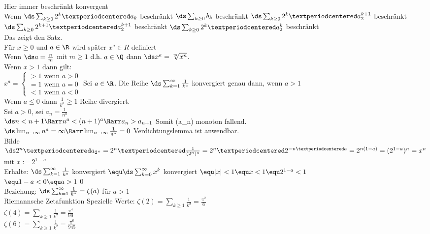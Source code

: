 Hier immer beschränkt \equ konvergent\\
Wenn $\ds \sum_{k \geq 0} 2^k · a_k$ beschränkt \Rarr $\ds \sum_{k \geq 0} b_k$ beschränkt \Rarr $\ds \sum_{k \geq 0} 2^{k} · a_2^{k+1}$ beschränkt \equ $\ds \sum_{k \geq 0} 2^{k+1} · a_2^{k+1}$ beschränkt \equ $\ds \sum_{k \geq 0} 2^{k} · a_2^{k}$ beschränkt\\
Das zeigt den Satz.\\
    Für $ x\geq 0$ und $a \in \R$ wird später $x^a \in R$ definiert\\
    Wenn $\ds a = \frac{n}{m}$ mit $m \geq 1$ d.h. $a \in \Q$ dann $\ds x^a = \sqrt[m]{x^n}$.\\
    Wenn $x > 1$ dann gilt: \\
    $x^a = \begin{cases} >1 \mbox{ wenn }a>0\\ =1 \mbox{ wenn }a=0\\ <1\mbox{ wenn }a<0 \end{cases}$
%
Sei $a \in \R$. Die Reihe $\ds \sum_{k=1}^{\infty} \frac{1}{k^a}$ konvergiert genau dann, wenn $a > 1$\\
\bew
Wenn $a \leq 0$ dann $\frac{1}{k^a} \geq 1$ \Rarr Reihe divergiert.\\
Sei $a >0$, sei $a_n = \frac{1}{n^a}$ \\
$\ds n < n+1 \Rarr n^a < (n+1)^a \Rarr a_n > a_{n+1}$ Somit (a_n) monoton fallend.\\
$\ds \lim_{n\to \infty} n^a = \infty \Rarr \lim_{n \to \infty} \frac{1}{n^a} = 0$ \Rarr Verdichtungslemma ist anwendbar.\\
Bilde $\ds 2^n · a_{2^n} = 2^n · \frac{1}{(2^n)^a} = 2^n · 2^{-n · a} = 2^{n(1-a)} = (2^{1-a})^n = x^n$\\
mit $x:=2^{1-a}$\\
Erhalte:
$\ds \sum_{k=1}^\infty \frac{1}{k^a}$ konvergiert $\equ \ds \sum_{k=0}^\infty x^k$ konvergiert $\equ |x|<1 \equ x<1 \equ 2^{1-a} <1$\\
$\equ 1-a<0 \equ a>1$\qed\\[4pt]
Beziehung:
$\ds \sum_{k=1}^\infty\frac{1}{k^a}=\zeta (a)$ für $a>1$\\
Riemannsche Zetafunktion
Spezielle Werte:
$\zeta (2) = \sum_{k\geq1}\frac{1}{k^2}=\frac{\pi^2}{6}$\\
$\zeta (4) = \sum_{k\geq1}\frac{1}{k^2}=\frac{\pi^4}{90}$\\
$\zeta (6) = \sum_{k\geq1}\frac{1}{k^2}=\frac{\pi^6}{945}$\\
